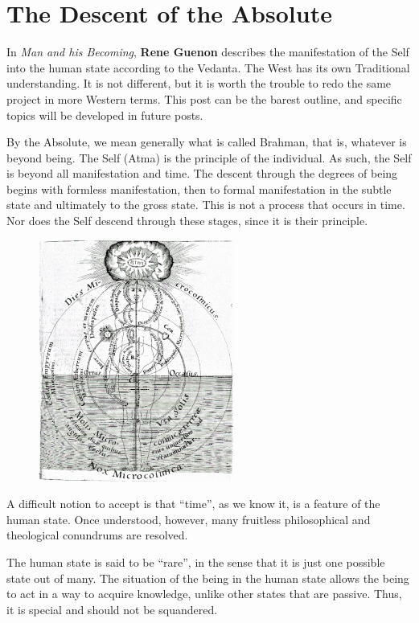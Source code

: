 \section{The Descent of the Absolute}

In \emph{Man and his Becoming}, \textbf{Rene Guenon} describes the manifestation of the Self into the human state according to the Vedanta. The West has its own Traditional understanding. It is not different, but it is worth the trouble to redo the same project in more Western terms. This post can be the barest outline, and specific topics will be developed in future posts.

By the Absolute, we mean generally what is called Brahman, that is, whatever is beyond being. The Self (Atma) is the principle of the individual. As such, the Self is beyond all manifestation and time. The descent through the degrees of being begins with formless manifestation, then to formal manifestation in the subtle state and ultimately to the gross state. This is not a process that occurs in time. Nor does the Self descend through these stages, since it is their principle.

\begin{figure}
 \includegraphics[scale=.5]{a20210307TheDescentoftheAbsolute-img001.png} 
\end{figure}

A difficult notion to accept is that “time”, as we know it, is a feature of the human state. Once understood, however, many fruitless philosophical and theological conundrums are resolved.

The human state is said to be “rare”, in the sense that it is just one possible state out of many. The situation of the being in the human state allows the being to act in a way to acquire knowledge, unlike other states that are passive. Thus, it is special and should not be squandered.

